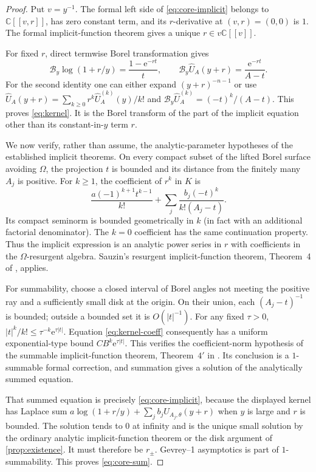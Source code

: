 \documentclass[11pt,a4paper]{article}
\numberwithin{equation}{section}
\theoremstyle{definition}
\theoremstyle{remark}
\newcommand{\C}{\mathbb C}
\newcommand{\e}{\mathrm e}
\newcommand{\B}{\mathcal B}
\begin{document}
\begin{proof}
Put $v=y^{-1}$. The formal left side of \eqref{eq:core-implicit} belongs to $\C[[v,r]]$, has zero constant term, and its $r$-derivative at $(v,r)=(0,0)$ is $1$. The formal implicit-function theorem gives a unique $r\in v\C[[v]]$.

For fixed $r$, direct termwise Borel transformation gives
\[
 \B_y\log(1+r/y)=\frac{1-\e^{-rt}}{t},\qquad
 \B_y\widehat U_A(y+r)=\frac{\e^{-rt}}{A-t}.
\]
For the second identity one can either expand $(y+r)^{-n-1}$ or use
$\widehat U_A(y+r)=\sum_{k\geq0}r^k\widehat U_A^{(k)}(y)/k!$ and
$\B_y\widehat U_A^{(k)}=(-t)^k/(A-t)$. This proves \eqref{eq:kernel}. It is the Borel transform of the part of the implicit equation other than its constant-in-$y$ term $r$.

We now verify, rather than assume, the analytic-parameter hypotheses of the established implicit theorems. On every compact subset of the lifted Borel surface avoiding $\Omega$, the projection $t$ is bounded and its distance from the finitely many $A_j$ is positive. For $k\geq1$, the coefficient of $r^k$ in $K$ is
\begin{equation}
 \frac{a(-1)^{k+1}t^{k-1}}{k!}
 +\sum_j\frac{b_j(-t)^k}{k!(A_j-t)}.
 \label{eq:kernel-coeff}
\end{equation}
Its compact seminorm is bounded geometrically in $k$ (in fact with an additional factorial denominator). The $k=0$ coefficient has the same continuation property. Thus the implicit expression is an analytic power series in $r$ with coefficients in the $\Omega$-resurgent algebra. Sauzin's resurgent implicit-function theorem, Theorem~4 of \cite{sauzin2015}, applies.

For summability, choose a closed interval of Borel angles not meeting the positive ray and a sufficiently small disk at the origin. On their union, each $(A_j-t)^{-1}$ is bounded; outside a bounded set it is $O(|t|^{-1})$. For any fixed $\tau>0$,
$|t|^k/k!\leq\tau^{-k}\e^{\tau|t|}$. Equation \eqref{eq:kernel-coeff} consequently has a uniform exponential-type bound $CB^k\e^{\tau|t|}$. This verifies the coefficient-norm hypothesis of the summable implicit-function theorem, Theorem~$4'$ in \cite{sauzin2015}. Its conclusion is a $1$-summable formal correction, and summation gives a solution of the analytically summed equation.

That summed equation is precisely \eqref{eq:core-implicit}, because the displayed kernel has Laplace sum
$a\log(1+r/y)+\sum_jb_jU_{A_j,\theta}(y+r)$ when $y$ is large and $r$ is bounded. The solution tends to $0$ at infinity and is the unique small solution by the ordinary analytic implicit-function theorem or the disk argument of \cref{prop:existence}. It must therefore be $r_\pm$. Gevrey--1 asymptotics is part of $1$-summability. This proves \eqref{eq:core-sum}.
\end{proof}
\end{document}

